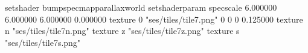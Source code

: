 setshader bumpspecmapparallaxworld
setshaderparam specscale 6.000000 6.000000 6.000000 0.000000
texture 0 "ses/tiles/tile7.png" 0 0 0 0.125000
texture n "ses/tiles/tile7n.png"
texture z "ses/tiles/tile7z.png"
texture s "ses/tiles/tile7s.png"

